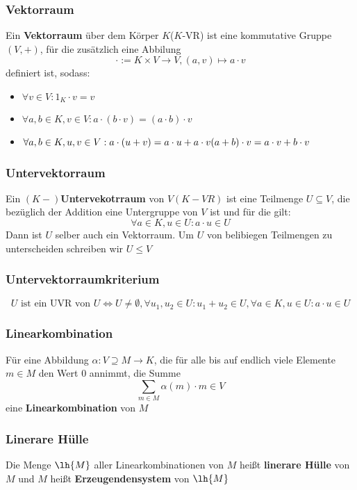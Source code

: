 \documentclass{kit}
\begin{document}
    \subsubsection{Vektorraum}
      Ein \textbf{Vektorraum} über dem Körper $K$($K$-VR) ist eine kommutative Gruppe $(V,+)$, für die zusätzlich eine Abbilung
      $$ \cdot:=K\times V\longrightarrow V,(a,v)\mapsto a\cdot v$$
      definiert ist, sodass:\\
      \begin{itemize}
        \item $\forall v\in V:1_K\cdot v=v$
        \item $\forall a,b\in K,v\in V:a\cdot(b\cdot v)=(a\cdot b)\cdot v$
        \item $\forall a,b\in K,u,v\in V:\\
          a\cdot(u+v)=a\cdot u+a\cdot v\\ 
          (a+b)\cdot v=a\cdot v+b\cdot v$
      \end{itemize}
    \subsubsection{Untervektorraum}
      Ein \textbf{$(K-)$Untervekotrraum} von $V(K-VR)$ ist eine Teilmenge $U\subseteq V$, die bezüglich der Addition eine Untergruppe von $V$ ist und für die gilt:
      $$\forall a\in K,u\in U:a\cdot u\in U$$
      Dann ist $U$ selber auch ein Vektorraum. Um $U$ von belibiegen Teilmengen zu unterscheiden schreiben wir $U\le V$
    \subsubsection{Untervektorraumkriterium}
      $$U\text{ ist ein UVR von }U\Longleftrightarrow U\neq\emptyset,\forall u_1,u_2\in U:u_1+u_2\in U,\forall a\in K,u\in U:a\cdot u\in U$$
    \subsubsection{Linearkombination}
      Für eine Abbildung $\alpha:V\supseteq M\longrightarrow K$, die für alle bis auf endlich viele Elemente $m\in M$ den Wert 0 annimmt, die Summe
      $$\sum_{m\in M}\alpha(m)\cdot m\in V$$
      eine \textbf{Linearkombination} von $M$
    \subsubsection{Linerare Hülle}
      Die Menge $\lh{M}$ aller Linearkombinationen von $M$ heißt \textbf{linerare Hülle} von $M$ und $M$ heißt \textbf{Erzeugendensystem} von $\lh{M}$
\end{document}
